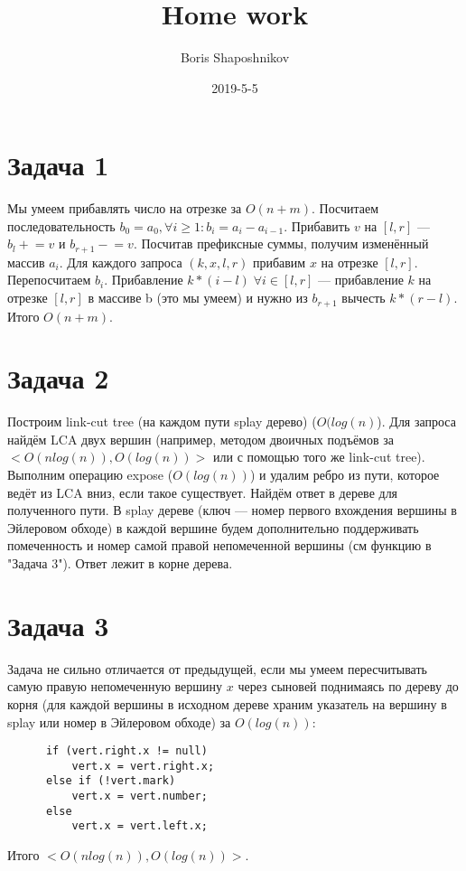 \documentclass{article}
\title{Home work}
\date{2019-5-5}
\author{Boris Shaposhnikov}
\begin{document}
\large
  \newpage
  \section*{Задача 1}
    Мы умеем прибавлять число на отрезке за $O(n + m)$. Посчитаем последовательность $b_0 = a_0, \forall i \geq 1: b_i = a_i - a_{i - 1}$. Прибавить $v$ на $[l, r]$ — $b_l \mathrel{+}= v$ и $b_{r + 1} \mathrel{-}= v$. Посчитав префиксные суммы, получим изменённый массив $a_i$.
    \newline
    Для каждого запроса $(k, x, l, r)$ прибавим $x$ на отрезке $[l, r]$. Перепосчитаем $b_i$. Прибавление $k * (i - l) \; \forall i \in [l, r]$ — прибавление $k$ на отрезке $[l, r]$ в массиве b (это мы умеем) и нужно из $b_{r + 1}$ вычесть $k * (r - l)$. Итого $O(n + m)$.
   \section*{Задача 2}
    Построим link-cut tree (на каждом пути splay дерево) ($O(log(n)$). Для запроса найдём LCA двух вершин (например, методом двоичных подъёмов за $<O(n log(n)), O(log(n))>$ или с помощью того же link-cut tree).
    Выполним операцию expose ($O(log(n))$) и удалим ребро из пути, которое ведёт из LCA вниз, если такое существует. Найдём ответ в дереве для полученного пути. В splay дереве (ключ — номер первого вхождения вершины в Эйлеровом обходе) в каждой вершине будем дополнительно поддерживать помеченность и номер самой правой непомеченной вершины (см функцию в "Задача 3"). Ответ лежит в корне дерева. 
    \section*{Задача 3}
    Задача не сильно отличается от предыдущей, если мы умеем пересчитывать самую правую непомеченную вершину $x$ через сыновей поднимаясь по дереву до корня (для каждой вершины в исходном дереве храним указатель на вершину в splay или номер в Эйлеровом обходе) за $O(log(n))$: 
    \begin{verbatim}
      if (vert.right.x != null)
          vert.x = vert.right.x;
      else if (!vert.mark)
          vert.x = vert.number;
      else
          vert.x = vert.left.x;
    \end{verbatim}
    Итого $<O(n log(n)), O(log(n))>$.
\end{document}
